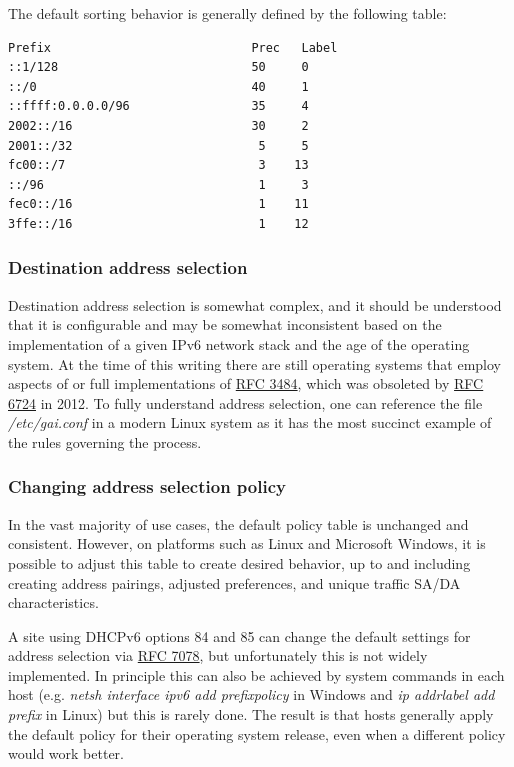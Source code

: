 \documentclass[
]{article}
\begin{document}
The default sorting behavior is generally defined by the following
table:

\begin{verbatim}
Prefix                            Prec   Label      
::1/128                           50     0    
::/0                              40     1  
::ffff:0.0.0.0/96                 35     4   
2002::/16                         30     2        
2001::/32                          5     5        
fc00::/7                           3    13   
::/96                              1     3       
fec0::/16                          1    11        
3ffe::/16                          1    12        
\end{verbatim}

\subsubsection{Destination address
selection}\label{destination-address-selection}

Destination address selection is somewhat complex, and it should be
understood that it is configurable and may be somewhat inconsistent
based on the implementation of a given IPv6 network stack and the age of
the operating system. At the time of this writing there are still
operating systems that employ aspects of or full implementations of
\href{https://www.rfc-editor.org/info/rfc3484}{RFC 3484}, which was
obsoleted by \href{https://www.rfc-editor.org/info/rfc6724}{RFC 6724} in
2012. To fully understand address selection, one can reference the file
\emph{/etc/gai.conf} in a modern Linux system as it has the most
succinct example of the rules governing the process.

\subsubsection{Changing address selection
policy}\label{changing-address-selection-policy}

In the vast majority of use cases, the default policy table is unchanged
and consistent. However, on platforms such as Linux and Microsoft
Windows, it is possible to adjust this table to create desired behavior,
up to and including creating address pairings, adjusted preferences, and
unique traffic SA/DA characteristics.

A site using DHCPv6 options 84 and 85 can change the default settings
for address selection via
\href{https://www.rfc-editor.org/info/rfc7078}{RFC 7078}, but
unfortunately this is not widely implemented. In principle this can also
be achieved by system commands in each host (e.g. \emph{netsh interface
ipv6 add prefixpolicy} in Windows and \emph{ip addrlabel add prefix} in
Linux) but this is rarely done. The result is that hosts generally apply
the default policy for their operating system release, even when a
different policy would work better.
\end{document}
